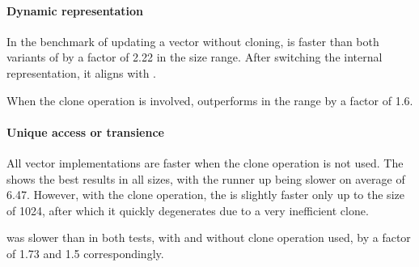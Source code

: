 \paragraph{Dynamic representation}
In the benchmark of updating a vector without cloning, \pvec{} is faster than both variants of \rrbvec{} by a factor of 2.22 in the \range{[10, 1024]} size range. After switching the internal representation, it aligns with \rrbvec{}. 

When the clone operation is involved, \pvec{} outperforms \rrbvec{} in the \range{[80, 1024]} range by a factor of 1.6. 

\paragraph{Unique access or transience}
All vector implementations are faster when the clone operation is not used. The \stdvec{} shows the best results in all sizes, with the runner up \pvec{} being slower on average of 6.47. However, with the clone operation, the \stdvec{} is slightly faster only up to the size of 1024, after which it quickly degenerates due to a very inefficient clone. 

\imrsvec{} was slower than \rrbvec{} in both tests, with and without clone operation used, by a factor of 1.73 and 1.5 correspondingly. 

